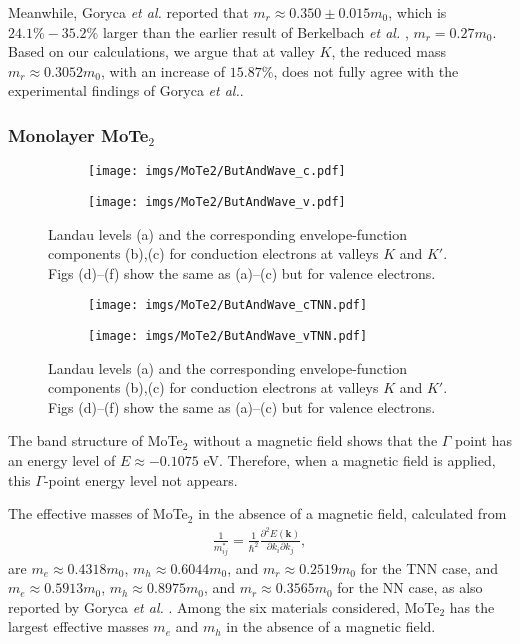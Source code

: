 \documentclass{article}
\begin{document}
Meanwhile, Goryca \textit{et al.} \cite{goryca2019} reported that $m_{r} \approx 0.350 \pm 0.015 m_{0}$, which is $24.1\%-35.2\%$ larger than the earlier result of Berkelbach \textit{et al.} \cite{berkelbach2013}, $m_{r} = 0.27 m_{0}$.
Based on our calculations, we argue that at valley $K$, the reduced mass $m_{r} \approx 0.3052 m_{0}$, with an increase of $15.87\%$, does not fully agree with the experimental findings of Goryca \textit{et al.}.






\newpage
\subsubsection*{Monolayer MoTe$_{2}$}
\begin{figure}[htb]
	\begin{subfigure}{0.495\textwidth}
		\centering
		\texttt{[image: imgs/MoTe2/ButAndWave\_c.pdf]}
	\end{subfigure}
	\begin{subfigure}{0.495\textwidth}
		\centering
		\texttt{[image: imgs/MoTe2/ButAndWave\_v.pdf]}
	\end{subfigure}
	\caption{Landau levels (a) and the corresponding envelope-function components (b),(c) for conduction electrons at valleys $K$ and $K'$. Figs (d)–(f) show the same as (a)–(c) but for valence electrons.}
\end{figure}
\begin{figure}[!h]
	\begin{subfigure}{0.495\textwidth}
		\centering
		\texttt{[image: imgs/MoTe2/ButAndWave\_cTNN.pdf]}
	\end{subfigure}
	\begin{subfigure}{0.495\textwidth}
		\centering
		\texttt{[image: imgs/MoTe2/ButAndWave\_vTNN.pdf]}
	\end{subfigure}
	\caption{Landau levels (a) and the corresponding envelope-function components (b),(c) for conduction electrons at valleys $K$ and $K'$. Figs (d)–(f) show the same as (a)–(c) but for valence electrons.}
\end{figure}
The band structure of MoTe$_{2}$ without a magnetic field shows that the $\Gamma$ point has an energy level of $E \approx -0.1075$ eV. Therefore, when a magnetic field is applied, this $\Gamma$-point energy level not appears.

The effective masses of MoTe$_{2}$ in the absence of a magnetic field, calculated from
\begin{gather}
	\frac{1}{m_{ij}^{*}} = \frac{1}{\hbar^{2}} \frac{\partial^{2} E(\mathbf{k})}{\partial k_{i}\partial k_{j}},
\end{gather}
are $m_{e} \approx 0.4318 m_{0}$, $m_{h} \approx 0.6044 m_{0}$, and $m_{r} \approx 0.2519 m_{0}$ for the TNN case, and $m_{e} \approx 0.5913 m_{0}$, $m_{h} \approx 0.8975 m_{0}$, and $m_{r} \approx 0.3565 m_{0}$ for the NN case, as also reported by Goryca \textit{et al.} \cite{goryca2019}. Among the six materials considered, MoTe$_{2}$ has the largest effective masses $m_{e}$ and $m_{h}$ in the absence of a magnetic field.
\end{document}
